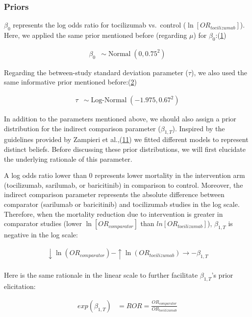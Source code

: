 \documentclass[
  12pt,
]{article}
\begin{document}
\hypertarget{priors}{%
\subsubsection{Priors}\label{priors}}

\(\beta_0\) represents the log odds ratio for tocilizumab vs.~control
(\(\ln[OR_{tocilizumab}]\)). Here, we applied the same prior mentioned
before (regarding \(\mu\)) for
\(\beta_0\):(\protect\hyperlink{ref-pedroza2018}{1})

\begin{align*}
\beta_0 & \sim \operatorname{Normal}(0, 0.75^2)
\end{align*}

Regarding the between-study standard deviation parameter (\(\tau\)), we
also used the same informative prior mentioned
before:(\protect\hyperlink{ref-turner2015}{2})

\begin{align*}
\tau & \sim \operatorname{Log-Normal}(-1.975, 0.67^2)
\end{align*}

In addition to the parameters mentioned above, we should also assign a
prior distribution for the indirect comparison parameter
(\(\beta_{1, T}\)). Inspired by the guidelines provided by Zampieri et
al.,(\protect\hyperlink{ref-zampieri2021}{11}) we fitted different
models to represent distinct beliefs. Before discussing these prior
distributions, we will first elucidate the underlying rationale of this
parameter.

A log odds ratio lower than \(0\) represents lower mortality in the
intervention arm (tocilizumab, sarilumab, or baricitinib) in comparison
to control. Moreover, the indirect comparison parameter represents the
absolute difference between comparator (sarilumab or baricitinib) and
tocilizumab studies in the log scale. Therefore, when the mortality
reduction due to intervention is greater in comparator studies (lower
\(\ln[OR_{comparator}]\) than \(ln[OR_{tocilizumab}]\)),
\(\beta_{1, T}\) is negative in the log scale:

\begin{align*}
\downarrow \ln(OR_{comparator}) - \uparrow \ln(OR_{tocilizumab}) \rightarrow -\beta_{1, T}\\
\end{align*}

Here is the same rationale in the linear scale to further facilitate
\(\beta_{1, T}\)'s prior elicitation:

\begin{align*}
exp(\beta_{1, T}) &= ROR =  \frac {OR_{comparator}}{OR_{tocilizumab}}
\end{align*}
\end{document}
